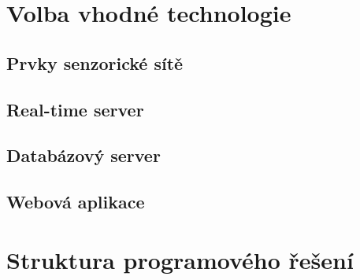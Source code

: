 \chapter{Volba vhodné technologie}

\section{Prvky senzorické sítě}
\section{Real-time server}
\section{Databázový server}
\section{Webová aplikace}

\chapter{Struktura programového řešení}